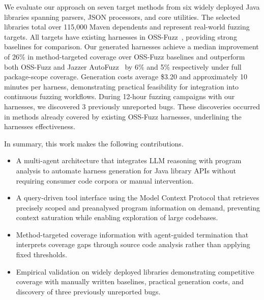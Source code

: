 We evaluate our approach on seven target methods from six widely deployed Java libraries spanning parsers, JSON processors, and core utilities. The selected libraries total over 115,000 Maven dependents and represent real-world fuzzing targets. All targets have existing harnesses in OSS-Fuzz~\cite{oss-fuzz}, providing strong baselines for comparison. Our generated harnesses achieve a median improvement of 26\% in method-targeted coverage over OSS-Fuzz baselines and outperform both OSS-Fuzz and Jazzer AutoFuzz~\cite{jazzer} by 6\% and 5\% respectively under full package-scope coverage. Generation costs average \$3.20 and approximately 10 minutes per harness, demonstrating practical feasibility for integration into continuous fuzzing workflows. During 12-hour fuzzing campaigns with our harnesses, we  discovered 3 previously unreported bugs. These discoveries occurred in methods already covered by existing OSS-Fuzz harnesses, underlining the harnesses effectiveness.
\par
In summary, this work makes the following contributions.
\begin{itemize}
    \item A multi-agent architecture that integrates LLM reasoning with program analysis to automate harness generation for Java library APIs without requiring consumer code corpora or manual intervention.

    \item A query-driven tool interface using the Model Context Protocol that retrieves precisely scoped and preanalysed program information on demand, preventing context saturation while enabling exploration of large codebases.

    \item Method-targeted coverage information with agent-guided termination that interprets coverage gaps through source code analysis rather than applying fixed thresholds.

    \item Empirical validation on widely deployed libraries demonstrating competitive coverage with manually written baselines, practical generation costs, and discovery of three previously unreported bugs.
\end{itemize}
